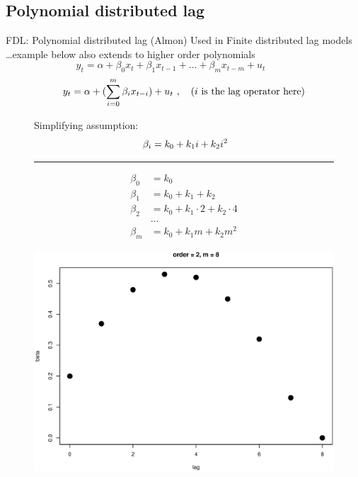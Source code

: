 \documentclass{beamer}
\begin{document}
\subsection{Polynomial distributed lag}
\begin{frame}{FDL: Polynomial distributed lag (Almon)}
Used in Finite distributed lag models\\
\dots example below also extends to higher order polynomials
\begin{equation} \label{Almon1}
y_t = \alpha + \beta_0 x_t + \beta_1 x_{t-1} + \dots + \beta_m x_{t-m} + u_t~~~~~~~~~~~~
\end{equation}
$$
y_t = \alpha + ( \sum_{i=0}^m \beta_i x_{t-i} ) + u_t~, 
\quad \left( i \textnormal{~is the lag operator here} \right)
$$
\begin{figure}[!htb]
    \centering
    \begin{minipage}{.48\textwidth}
    Simplifying assumption:
\begin{equation} \label{eqpol2}
~\beta_i = k_0 + k_1 i  + k_2  i^2  \\ 
\end{equation}
\hrule 
\smallskip
\small{
\begin{equation*}
\begin{aligned}
\beta_0 & = k_0  \\
\beta_1 & = k_0 + k_1 + k_2 \\
\beta_2 & = k_0 + k_1\!\cdot\!2 + k_2\!\cdot\!4 \\
& \ldots \\ 
\beta_m & = k_0 +  k_1 m +  k_2 m^2 
\end{aligned}
\end{equation*}
}%
\end{minipage}
\begin{minipage}{0.509\textwidth}
\includegraphics[width=\textwidth]{img/Polynom_2.eps}
\end{minipage}
\end{figure}
\end{frame}
\end{document}
